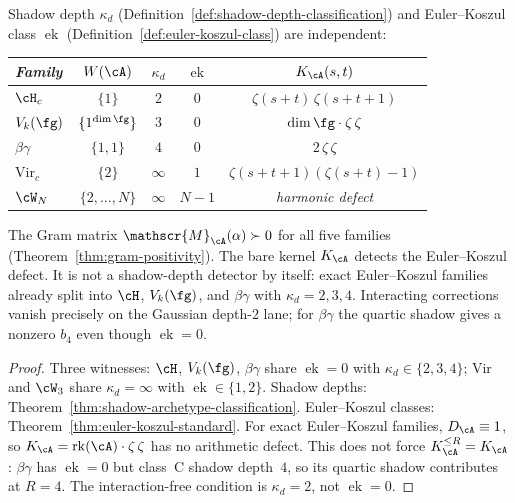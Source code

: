 \begin{theorem}[\ClaimStatusConditional]%
\label{thm:shadow-euler-independence}%
%
%
Shadow depth $\kappa_d$
\textup{(}Definition~\textup{\ref{def:shadow-depth-classification}}\textup{)}
and Euler--Koszul class $\operatorname{ek}$
\textup{(}Definition~\textup{\ref{def:euler-koszul-class}}\textup{)}
are independent:
\begin{center}
\small
\renewcommand{\arraystretch}{1.2}
\begin{tabular}{lcccc}
\toprule
\emph{Family} & $W(\cA)$ & $\kappa_d$ & $\operatorname{ek}$
 & $K_\cA(s,t)$ \\
\midrule
$\cH_c$ & $\{1\}$ & $2$ & $0$
 & $\zeta(s{+}t)\,\zeta(s{+}t{+}1)$ \\
$V_k(\fg)$ & $\{1^{\dim\fg}\}$ & $3$ & $0$
 & $\dim\fg\cdot\zeta\,\zeta$ \\
$\beta\gamma$ & $\{1,1\}$ & $4$ & $0$
 & $2\,\zeta\,\zeta$ \\
$\mathrm{Vir}_c$ & $\{2\}$ & $\infty$ & $1$
 & $\zeta(s{+}t{+}1)(\zeta(s{+}t){-}1)$ \\
$\cW_N$ & $\{2,\ldots,N\}$ & $\infty$ & $N{-}1$
 & \emph{harmonic defect} \\
\bottomrule
\end{tabular}
\end{center}
The Gram matrix $\mathscr{M}_\cA(\alpha) \succ 0$ for all
five families \textup{(}Theorem~\textup{\ref{thm:gram-positivity}}\textup{)}.
The bare kernel $K_\cA$ detects the Euler--Koszul defect. It is not a
shadow-depth detector by itself: exact Euler--Koszul families already
split into $\cH$, $V_k(\fg)$, and $\beta\gamma$ with
$\kappa_d=2,3,4$. Interacting corrections vanish precisely on the
Gaussian depth-$2$ lane; for $\beta\gamma$ the quartic shadow gives a
nonzero $b_4$ even though $\operatorname{ek}=0$.
\end{theorem}

\begin{proof}
Three witnesses:
$\cH$, $V_k(\fg)$, $\beta\gamma$ share $\operatorname{ek} = 0$
with $\kappa_d \in \{2,3,4\}$;
$\mathrm{Vir}$ and $\cW_3$ share $\kappa_d = \infty$ with
$\operatorname{ek} \in \{1, 2\}$.
Shadow depths: Theorem~\ref{thm:shadow-archetype-classification}.
Euler--Koszul classes: Theorem~\ref{thm:euler-koszul-standard}.
For exact Euler--Koszul families, $D_\cA\equiv1$, so
$K_\cA=\operatorname{rk}(\cA)\cdot\zeta\,\zeta$ has no arithmetic
defect. This does not force $K_\cA^{\leq R}=K_\cA$:
$\beta\gamma$ has $\operatorname{ek}=0$ but class~C shadow depth~$4$,
so its quartic shadow contributes at $R=4$. The interaction-free
condition is $\kappa_d=2$, not $\operatorname{ek}=0$.
\end{proof}

